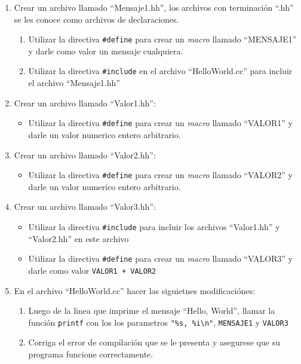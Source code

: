 \documentclass{article}
\begin{document}
\begin{enumerate}
\item{Crear un archivo llamado ``Mensaje1.hh'', los archivos con terminaci\'on ``.hh''
se les conoce como archivos de declaraciones.
    \begin{enumerate}
        \item{Utilizar la directiva \texttt{\#define} para crear un \emph{macro} llamado
        ``MENSAJE1'' y darle como valor un mensaje cualquiera.}
        \item{Utilizar la directiva \texttt{\#include} en el archivo ``HelloWorld.cc''
        para incluir el archivo ``Mensaje1.hh''}
    \end{enumerate}
}
\item{Crear un archivo llamado ``Valor1.hh'':
    \begin{itemize}
        \item{Utilizar la directiva \texttt{\#define} para crear un \emph{macro} llamado
        ``VALOR1'' y darle un valor numerico entero arbitrario.}
    \end{itemize}
}
\item{Crear un archivo llamado ``Valor2.hh'':
\begin{itemize}
    \item{Utilizar la directiva \texttt{\#define} para crear un \emph{macro} llamado
    ``VALOR2'' y darle un valor numerico entero arbitrario.}
\end{itemize}
}
\item{Crear un archivo llamado ``Valor3.hh'':
\begin{itemize}
    \item{Utilizar la directiva \texttt{\#include} para incluir los archivos
    ``Valor1.hh'' y ``Valor2.hh'' en este archivo}
    \item{Utilizar la directiva \texttt{\#define} para crear un \emph{macro} llamado
    ``VALOR3'' y darle como valor \texttt{VALOR1 + VALOR2}}
\end{itemize}
}
\item{En el archivo ``HelloWorld.cc'' hacer las siguietnes modificaci\'ones:
\begin{enumerate}
    \item{Luego de la linea que imprime el mensaje ``Hello, World'', llamar la funci\'on
    \texttt{printf} con los los parametros \texttt{"\%s, \%i\textbackslash n"}, \texttt{MENSAJE1} y \texttt{VALOR3}}
    \item{Corriga el error de compilaci\'on que se le presenta y asegurese que su programa
    funcione correctamente.}
\end{enumerate}
}

\end{enumerate}
\end{document}
